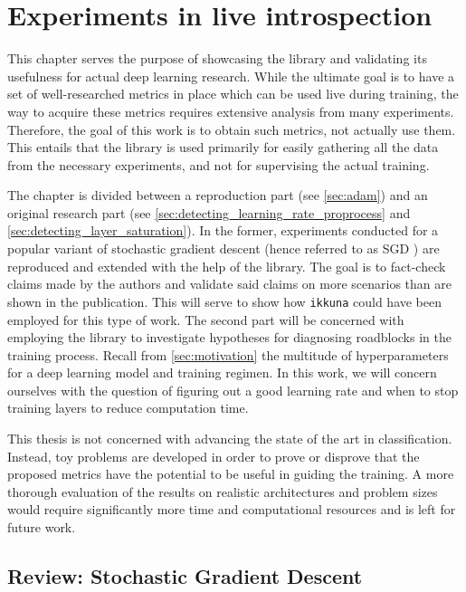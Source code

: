 \chapter{Experiments in live introspection}
\label{ch:experiments}

This chapter serves the purpose of showcasing the library and validating its
usefulness for actual deep learning research. While the ultimate goal is to have
a set of well-researched metrics in place which can be used live during
training, the way to acquire these metrics requires extensive analysis from many
experiments. Therefore, the goal of this work is to obtain such metrics, not
actually use them. This entails that the library is used primarily for easily
gathering all the data from the necessary experiments, and not for supervising
the actual training.

The chapter is divided between a reproduction part (see
\cref{sec:adam}) and an original research part (see
\cref{sec:detecting_learning_rate_proprocess} and
\cref{sec:detecting_layer_saturation}). In the former, experiments conducted
for a popular variant of stochastic gradient descent (hence referred to as SGD
) are reproduced and extended with
the help of the library. The goal is to fact-check claims made by the authors
and validate said claims on more scenarios than are shown in the
publication. This will serve to show how \texttt{ikkuna} could have been
employed for this type of work. The second part will be concerned with employing
the library to investigate hypotheses for diagnosing roadblocks in the training
process. Recall from \cref{sec:motivation} the multitude of hyperparameters
for a deep learning model and training regimen. In this work, we will concern
ourselves with the question of figuring out a good learning rate and when to
stop training layers to reduce computation time.

This thesis is not concerned with advancing the state of the art in
classification. Instead, toy problems are developed in order to prove or
disprove that the proposed metrics have the potential to be useful in guiding
the training. A more thorough evaluation of the results on realistic
architectures and problem sizes would require significantly more time and
computational resources and is left for future work.

\section{Review: Stochastic Gradient Descent}%
\label{sec:review_stochastic_gradient_descent}

